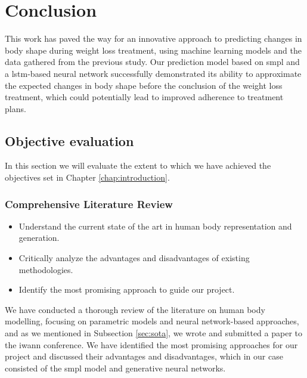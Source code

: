 
\chapter{Conclusion}\label{chap:conclusion}

This work has paved the way for an innovative approach to predicting changes in
body shape during weight loss treatment, using machine learning models and the
data gathered from the previous study. Our prediction model based on \gls{smpl}
and a \gls{lstm}-based neural network successfully demonstrated its ability to
approximate the expected changes in body shape before the conclusion of the
weight loss treatment, which could potentially lead to improved adherence to
treatment plans.

\section{Objective evaluation}

In this section we will evaluate the extent to which we have achieved the
objectives set in Chapter \ref{chap:introduction}.

\subsection{Comprehensive Literature Review}

\begin{itemize}
      \item Understand the current state of the art in human body representation and
            generation.

      \item Critically analyze the advantages and disadvantages of existing methodologies.
      \item Identify the most promising approach to guide our project.
\end{itemize}

We have conducted a thorough review of the literature on human body modelling,
focusing on parametric models and neural network-based approaches, and as we
mentioned in Subsection \ref{sec:sota}, we wrote and submitted a paper to the
\gls{iwann} conference. We have identified the most promising approaches for
our project and discussed their advantages and disadvantages, which in our case
consisted of the \gls{smpl} model and generative neural networks.

